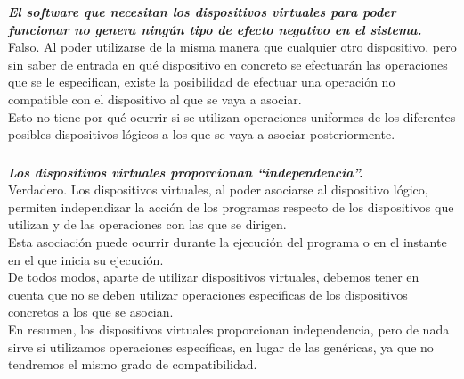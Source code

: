 \documentclass[spanish]{article}
\begin{document}
\textbf{\textit{El software que necesitan los dispositivos
virtuales para poder funcionar no genera ningún tipo de
efecto negativo en el sistema.}}\\

Falso. Al poder utilizarse de la misma manera que cualquier
otro dispositivo, pero sin saber de entrada en qué
dispositivo en concreto se efectuarán las operaciones que se
le especifican, existe la posibilidad de efectuar una
operación no compatible con el dispositivo al que se vaya a
asociar.\\

Esto no tiene por qué ocurrir si se utilizan operaciones
uniformes de los diferentes posibles dispositivos lógicos a
los que se vaya a asociar posteriormente.

\subsubsection{}

\textbf{\textit{Los dispositivos virtuales proporcionan
``independencia''.}}\\

Verdadero. Los dispositivos virtuales, al poder asociarse al
dispositivo lógico, permiten independizar la acción de los
programas respecto de los dispositivos que utilizan y de las
operaciones con las que se dirigen.\\

Esta asociación puede ocurrir durante la ejecución del
programa o en el instante en el que inicia su ejecución.\\

De todos modos, aparte de utilizar dispositivos virtuales,
debemos tener en cuenta que no se deben utilizar operaciones
específicas de los dispositivos concretos a los que se
asocian.\\

En resumen, los dispositivos virtuales proporcionan
independencia, pero de nada sirve si utilizamos operaciones
específicas, en lugar de las genéricas, ya que no tendremos
el mismo grado de compatibilidad.

\newpage
\end{document}
